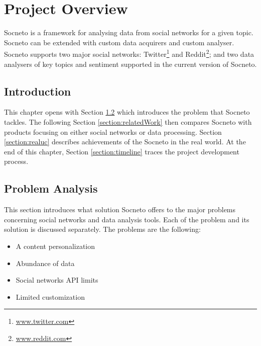 \chapter{Project Overview}

Socneto is a framework for analysing data from social networks for a given topic. Socneto can be extended with custom data acquirers and custom analyser. Socneto supports two major social networks: Twitter\footnote{\url{www.twitter.com}} and Reddit\footnote{\url{www.reddit.com}}; and two data analysers of key topics and sentiment supported in the current version of Socneto. 


\section{Introduction}\label{section:intro}

This chapter opens with Section \ref{section:problemAnalysis} which introduces the problem that Socneto tackles. The following Section \ref{section:relatedWork} then compares Socneto with products focusing on either social networks or data processing. Section \ref{section:realuc} describes achievements of the Socneto in the real world. At the end of this chapter, Section \ref{section:timeline} traces the project development process. 

\section{Problem Analysis}\label{section:problemAnalysis}

This section introduces what solution Socneto offers to the major problems concerning social networks and data analysis tools. Each of the problem and its solution is discussed separately. The problems are the following:

\begin{itemize}
    \item A content personalization
    \item Abundance of data
    \item Social networks API limits
    \item Limited customization
\end{itemize}


